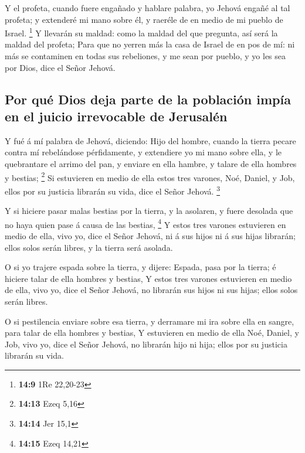  Y el profeta, cuando fuere engañado y hablare palabra, yo
Jehová engañé al tal profeta; y extenderé mi mano sobre él, y raeréle de
en medio de mi pueblo de Israel. \footnote{\textbf{14:9} 1Re 22,20-23}
 Y llevarán su maldad: como la maldad del que pregunta,
así será la maldad del profeta;  Para que no yerren más
la casa de Israel de en pos de mí: ni más se contaminen en todas sus
rebeliones, y me sean por pueblo, y yo les sea por Dios, dice el Señor
Jehová.

\hypertarget{por-quuxe9-dios-deja-parte-de-la-poblaciuxf3n-impuxeda-en-el-juicio-irrevocable-de-jerusaluxe9n}{%
\subsection{Por qué Dios deja parte de la población impía en el juicio
irrevocable de
Jerusalén}\label{por-quuxe9-dios-deja-parte-de-la-poblaciuxf3n-impuxeda-en-el-juicio-irrevocable-de-jerusaluxe9n}}

 Y fué á mí palabra de Jehová, diciendo: 
Hijo del hombre, cuando la tierra pecare contra mí rebelándose
pérfidamente, y extendiere yo mi mano sobre ella, y le quebrantare el
arrimo del pan, y enviare en ella hambre, y talare de ella hombres y
bestias; \footnote{\textbf{14:13} Ezeq 5,16}  Si
estuvieren en medio de ella estos tres varones, Noé, Daniel, y Job,
ellos por su justicia librarán su vida, dice el Señor Jehová.
\footnote{\textbf{14:14} Jer 15,1}

 Y si hiciere pasar malas bestias por la tierra, y la
asolaren, y fuere desolada que no haya quien pase á causa de las
bestias, \footnote{\textbf{14:15} Ezeq 14,21}  Y estos
tres varones estuvieren en medio de ella, vivo yo, dice el Señor Jehová,
ni á sus hijos ni á sus hijas librarán; ellos solos serán libres, y la
tierra será asolada.

 O si yo trajere espada sobre la tierra, y dijere:
Espada, pasa por la tierra; é hiciere talar de ella hombres y bestias,
 Y estos tres varones estuvieren en medio de ella, vivo
yo, dice el Señor Jehová, no librarán sus hijos ni sus hijas; ellos
solos serán libres.

 O si pestilencia enviare sobre esa tierra, y derramare
mi ira sobre ella en sangre, para talar de ella hombres y bestias,
 Y estuvieren en medio de ella Noé, Daniel, y Job, vivo
yo, dice el Señor Jehová, no librarán hijo ni hija; ellos por su
justicia librarán su vida.

